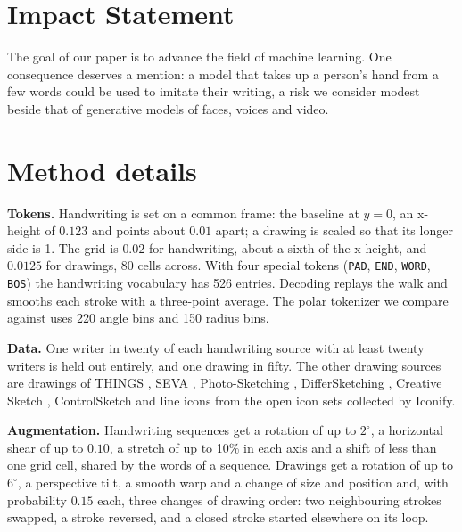 \documentclass{article}
\begin{document}
\section*{Impact Statement}

The goal of our paper is to advance the field of machine learning. One consequence deserves a mention: a model that takes up a person's hand from a few words could be used to imitate their writing, a risk we consider modest beside that of generative models of faces, voices and video.




\newpage
\appendix
\onecolumn
\raggedbottom
\section{Method details}
\label{appendix_a}
\label{app:methods}

\textbf{Tokens.} Handwriting is set on a common frame: the baseline at $y=0$, an x-height of $0.123$ and points about $0.01$ apart; a drawing is scaled so that its longer side is 1. The grid is $0.02$ for handwriting, about a sixth of the x-height, and $0.0125$ for drawings, 80 cells across. With four special tokens (\texttt{PAD}, \texttt{END}, \texttt{WORD}, \texttt{BOS}) the handwriting vocabulary has 526 entries. Decoding replays the walk and smooths each stroke with a three-point average. The polar tokenizer we compare against uses 220 angle bins and 150 radius bins.

\textbf{Data.} One writer in twenty of each handwriting source with at least twenty writers is held out entirely, and one drawing in fifty. The other drawing sources are drawings of THINGS \citep{mukherjee2026drawings}, SEVA \citep{mukherjee2023seva}, Photo-Sketching \citep{li2019photo}, DifferSketching \citep{xiao2022differsketching}, Creative Sketch \citep{ge2021creative}, ControlSketch \citep{arar2025swiftsketch} and line icons from the open icon sets collected by Iconify.

\textbf{Augmentation.} Handwriting sequences get a rotation of up to $2^\circ$, a horizontal shear of up to $0.10$, a stretch of up to 10\% in each axis and a shift of less than one grid cell, shared by the words of a sequence. Drawings get a rotation of up to $6^\circ$, a perspective tilt, a smooth warp and a change of size and position and, with probability $0.15$ each, three changes of drawing order: two neighbouring strokes swapped, a stroke reversed, and a closed stroke started elsewhere on its loop.
\end{document}
